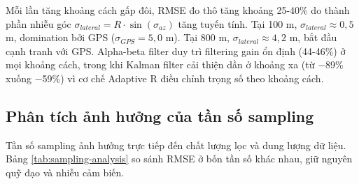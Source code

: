 \begin{table}[H]
\centering
\caption{RMSE theo khoảng cách người quan sát (người đi bộ, seed=42)}
\label{tab:rmse-vs-range}
\end{table}

Mỗi lần tăng khoảng cách gấp đôi, RMSE đo thô tăng khoảng 25-40\% do thành phần nhiễu góc $\sigma_{lateral} = R \cdot \sin(\sigma_{az})$ tăng tuyến tính. Tại 100 m, $\sigma_{lateral} \approx 0{,}5$ m, domination bởi GPS ($\sigma_{GPS} = 5{,}0$ m). Tại 800 m, $\sigma_{lateral} \approx 4{,}2$ m, bắt đầu cạnh tranh với GPS. Alpha-beta filter duy trì filtering gain ổn định (44-46\%) ở mọi khoảng cách, trong khi Kalman filter cải thiện dần ở khoảng xa (từ $-$89\% xuống $-$59\%) vì cơ chế Adaptive R điều chỉnh trọng số theo khoảng cách.

\subsection{Phân tích ảnh hưởng của tần số sampling}

\hspace{0.5cm} Tần số sampling ảnh hưởng trực tiếp đến chất lượng lọc và dung lượng dữ liệu. Bảng \ref{tab:sampling-analysis} so sánh RMSE ở bốn tần số khác nhau, giữ nguyên quỹ đạo và nhiễu cảm biến.

\begin{table}[H]
\centering
\caption{RMSE theo tần số sampling (xe máy, seed=42)}
\label{tab:sampling-analysis}
\end{table}

